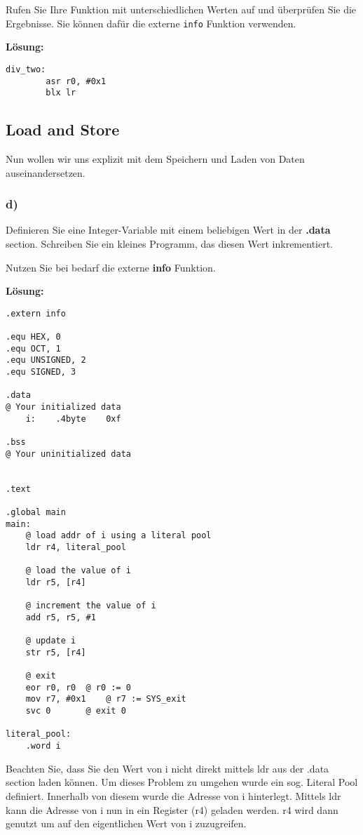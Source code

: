 \documentclass[12pt]{article}
\begin{document}
Rufen Sie Ihre Funktion mit unterschiedlichen Werten auf und überprüfen Sie die Ergebnisse. Sie können dafür
die externe \texttt{info} Funktion verwenden.

\textbf{Lösung:}
\begin{lstlisting}
div_two:
        asr r0, #0x1
        blx lr
\end{lstlisting}

\subsection{Load and Store}
Nun wollen wir uns explizit mit dem Speichern und Laden von Daten auseinandersetzen.

\subsubsection{d)}
Definieren Sie eine Integer-Variable mit einem beliebigen Wert in der \textbf{.data} section.
Schreiben Sie ein kleines Programm, das diesen Wert inkrementiert. 

Nutzen Sie bei bedarf die externe \textbf{info} Funktion.

\textbf{Lösung:}
\begin{lstlisting}
.extern info

.equ HEX, 0
.equ OCT, 1
.equ UNSIGNED, 2
.equ SIGNED, 3

.data
@ Your initialized data
	i:    .4byte	0xf

.bss
@ Your uninitialized data


.text

.global main
main:
	@ load addr of i using a literal pool
	ldr r4, literal_pool
	
	@ load the value of i
	ldr r5, [r4]
	
	@ increment the value of i
	add r5, r5, #1

	@ update i
	str r5, [r4]

	@ exit
	eor r0, r0	@ r0 := 0
	mov r7, #0x1	@ r7 := SYS_exit
	svc 0		@ exit 0

literal_pool:
	.word i
\end{lstlisting}
Beachten Sie, dass Sie den Wert von i nicht direkt mittels ldr aus der .data section laden können.
Um dieses Problem zu umgehen wurde ein sog. Literal Pool definiert. Innerhalb von diesem wurde die Adresse
von i hinterlegt. Mittels ldr kann die Adresse von i nun in ein Register (r4) geladen werden. r4 wird
dann genutzt um auf den eigentlichen Wert von i zuzugreifen.
\end{document}
